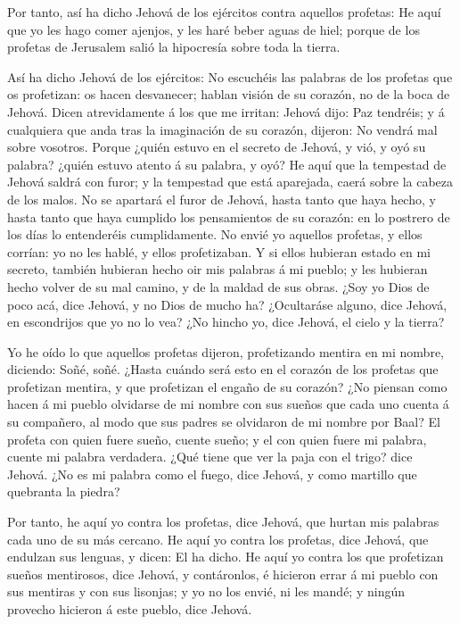  Por tanto, así ha dicho Jehová de los ejércitos contra
aquellos profetas: He aquí que yo les hago comer ajenjos, y les haré
beber aguas de hiel; porque de los profetas de Jerusalem salió la
hipocresía sobre toda la tierra.

 Así ha dicho Jehová de los ejércitos: No escuchéis las
palabras de los profetas que os profetizan: os hacen desvanecer; hablan
visión de su corazón, no de la boca de Jehová.  Dicen
atrevidamente á los que me irritan: Jehová dijo: Paz tendréis; y á
cualquiera que anda tras la imaginación de su corazón, dijeron: No
vendrá mal sobre vosotros.  Porque ¿quién estuvo en el
secreto de Jehová, y vió, y oyó su palabra? ¿quién estuvo atento á su
palabra, y oyó?  He aquí que la tempestad de Jehová saldrá
con furor; y la tempestad que está aparejada, caerá sobre la cabeza de
los malos.  No se apartará el furor de Jehová, hasta tanto
que haya hecho, y hasta tanto que haya cumplido los pensamientos de su
corazón: en lo postrero de los días lo entenderéis cumplidamente.
 No envié yo aquellos profetas, y ellos corrían: yo no les
hablé, y ellos profetizaban.  Y si ellos hubieran estado en
mi secreto, también hubieran hecho oir mis palabras á mi pueblo; y les
hubieran hecho volver de su mal camino, y de la maldad de sus obras.
 ¿Soy yo Dios de poco acá, dice Jehová, y no Dios de mucho
ha?  ¿Ocultaráse alguno, dice Jehová, en escondrijos que yo
no lo vea? ¿No hincho yo, dice Jehová, el cielo y la tierra?

 Yo he oído lo que aquellos profetas dijeron, profetizando
mentira en mi nombre, diciendo: Soñé, soñé.  ¿Hasta cuándo
será esto en el corazón de los profetas que profetizan mentira, y que
profetizan el engaño de su corazón?  ¿No piensan como hacen
á mi pueblo olvidarse de mi nombre con sus sueños que cada uno cuenta á
su compañero, al modo que sus padres se olvidaron de mi nombre por Baal?
 El profeta con quien fuere sueño, cuente sueño; y el con
quien fuere mi palabra, cuente mi palabra verdadera. ¿Qué tiene que ver
la paja con el trigo? dice Jehová.  ¿No es mi palabra como
el fuego, dice Jehová, y como martillo que quebranta la piedra?

 Por tanto, he aquí yo contra los profetas, dice Jehová,
que hurtan mis palabras cada uno de su más cercano.  He
aquí yo contra los profetas, dice Jehová, que endulzan sus lenguas, y
dicen: El ha dicho.  He aquí yo contra los que profetizan
sueños mentirosos, dice Jehová, y contáronlos, é hicieron errar á mi
pueblo con sus mentiras y con sus lisonjas; y yo no los envié, ni les
mandé; y ningún provecho hicieron á este pueblo, dice Jehová.

